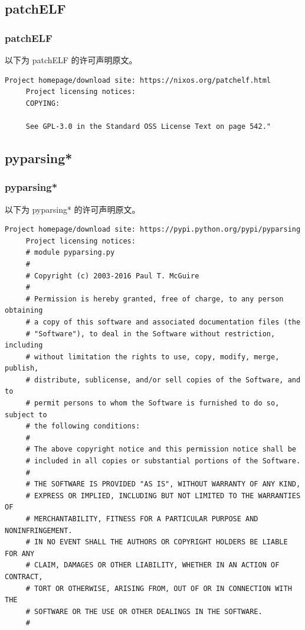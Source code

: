 \subsection{patchELF}
\subsubsection*{patchELF}

以下为 patchELF 的许可声明原文。

\begin{lstlisting}[basicstyle=\ttfamily\footnotesize,breaklines=true]
     Project homepage/download site: https://nixos.org/patchelf.html
     Project licensing notices:
     COPYING:

     See GPL-3.0 in the Standard OSS License Text on page 542."
\end{lstlisting}

\subsection{pyparsing*}
\subsubsection*{pyparsing*}

以下为 pyparsing* 的许可声明原文。

\begin{lstlisting}[basicstyle=\ttfamily\footnotesize,breaklines=true]
     Project homepage/download site: https://pypi.python.org/pypi/pyparsing
     Project licensing notices:
     # module pyparsing.py
     #
     # Copyright (c) 2003-2016 Paul T. McGuire
     #
     # Permission is hereby granted, free of charge, to any person obtaining
     # a copy of this software and associated documentation files (the
     # "Software"), to deal in the Software without restriction, including
     # without limitation the rights to use, copy, modify, merge, publish,
     # distribute, sublicense, and/or sell copies of the Software, and to
     # permit persons to whom the Software is furnished to do so, subject to
     # the following conditions:
     #
     # The above copyright notice and this permission notice shall be
     # included in all copies or substantial portions of the Software.
     #
     # THE SOFTWARE IS PROVIDED "AS IS", WITHOUT WARRANTY OF ANY KIND,
     # EXPRESS OR IMPLIED, INCLUDING BUT NOT LIMITED TO THE WARRANTIES OF
     # MERCHANTABILITY, FITNESS FOR A PARTICULAR PURPOSE AND NONINFRINGEMENT.
     # IN NO EVENT SHALL THE AUTHORS OR COPYRIGHT HOLDERS BE LIABLE FOR ANY
     # CLAIM, DAMAGES OR OTHER LIABILITY, WHETHER IN AN ACTION OF CONTRACT,
     # TORT OR OTHERWISE, ARISING FROM, OUT OF OR IN CONNECTION WITH THE
     # SOFTWARE OR THE USE OR OTHER DEALINGS IN THE SOFTWARE.
     #
\end{lstlisting}

